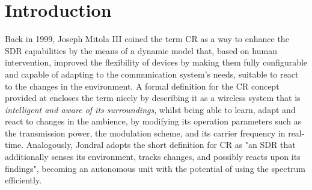 \acresetall
\chapter{Introduction}\label{ch:intro}

Back in 1999, Joseph Mitola III coined the term \ac{CR}\cite{Mitola1999} as a way to enhance the \ac{SDR} capabilities by the means of a dynamic model that, based on human intervention, improved the flexibility of devices by making them fully configurable and capable of adapting to the communication system's needs, suitable to react to the changes in the environment. A formal definition for the \ac{CR} concept provided at \cite{Haykin2005} encloses the term nicely by describing it as a wireless system that is \emph{intelligent and aware of its surroundings}, whilst being able to learn, adapt and react to changes in the ambience, by modifying its operation parameters such as the transmission power, the modulation scheme, and its carrier frequency in real-time. Analogously, Jondral \cite{Jondral2005} adopts the short definition for \ac{CR} as "an \ac{SDR} that additionally senses its environment, tracks changes, and possibly reacts upon its findings", becoming an autonomous unit with the potential of using the spectrum efficiently.\\

